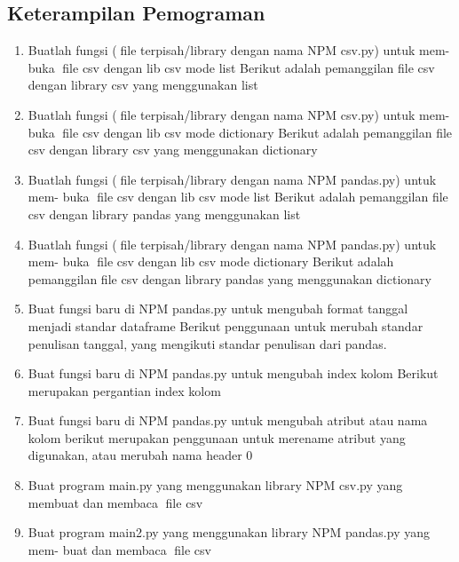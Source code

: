  \subsection{Keterampilan Pemograman}
\begin{enumerate}
    \item Buatlah fungsi (file terpisah/library dengan nama NPM csv.py) untuk mem-
    buka file csv dengan lib csv mode list
    Berikut adalah pemanggilan file csv dengan library csv yang menggunakan list
    

    \item Buatlah fungsi (file terpisah/library dengan nama NPM csv.py) untuk mem-
    buka file csv dengan lib csv mode dictionary
    Berikut adalah pemanggilan file csv dengan library csv yang menggunakan dictionary
    

    \item Buatlah fungsi (file terpisah/library dengan nama NPM pandas.py) untuk mem-
    buka file csv dengan lib csv mode list
    Berikut adalah pemanggilan file csv dengan library pandas yang menggunakan list
    

    \item Buatlah fungsi (file terpisah/library dengan nama NPM pandas.py) untuk mem-
    buka file csv dengan lib csv mode dictionary
    Berikut adalah pemanggilan file csv dengan library pandas yang menggunakan dictionary
    

    \item Buat fungsi baru di NPM pandas.py untuk mengubah format tanggal menjadi
    standar dataframe
    Berikut penggunaan untuk merubah standar penulisan tanggal, yang mengikuti standar penulisan dari pandas.
    

    \item Buat fungsi baru di NPM pandas.py untuk mengubah index kolom
    Berikut merupakan pergantian index kolom
    

    \item Buat fungsi baru di NPM pandas.py untuk mengubah atribut atau nama kolom
    berikut merupakan penggunaan untuk merename atribut yang digunakan, atau merubah nama header 0
    

    \item Buat program main.py yang menggunakan library NPM csv.py yang membuat
    dan membaca file csv
    

    \item Buat program main2.py yang menggunakan library NPM pandas.py yang mem-
    buat dan membaca file csv
    
\end{enumerate}


